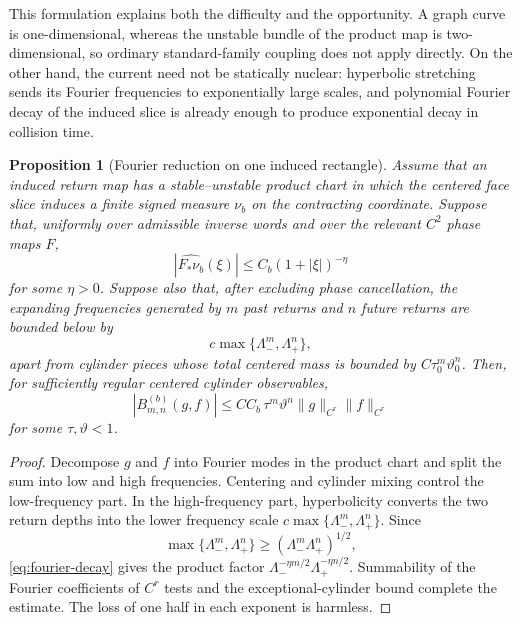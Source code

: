 \documentclass[11pt]{article}
\newtheorem{proposition}[theorem]{Proposition}
\begin{document}
This formulation explains both the difficulty and the opportunity.  A graph
curve is one-dimensional, whereas the unstable bundle of the product map is
two-dimensional, so ordinary standard-family coupling does not apply
directly.  On the other hand, the current need not be statically nuclear:
hyperbolic stretching sends its Fourier frequencies to exponentially large
scales, and polynomial Fourier decay of the induced slice is already enough
to produce exponential decay in collision time.

\begin{proposition}[Fourier reduction on one induced rectangle]
\label{prop:fourier-reduction}
Assume that an induced return map has a stable--unstable product chart in
which the centered face slice induces a finite signed measure $\nu_b$ on the
contracting coordinate.  Suppose that, uniformly over admissible inverse
words and over the relevant $C^2$ phase maps $F$,
\begin{equation}
\label{eq:fourier-decay}
 |\widehat{F_*\nu_b}(\xi)|\le C_b(1+|\xi|)^{-\eta}
\end{equation}
for some $\eta>0$.  Suppose also that, after excluding phase cancellation,
the expanding frequencies generated by $m$ past returns and $n$ future
returns are bounded below by
\[
 c\max\{\Lambda_-^m,\Lambda_+^n\},
\]
apart from cylinder pieces whose total centered mass is bounded by
$C\tau_0^m\vartheta_0^n$.  Then, for sufficiently regular
centered cylinder observables,
\begin{equation}
 |B_{m,n}^{(b)}(g,f)|
 \le C C_b\,\tau^m\vartheta^n\|g\|_{C^r}\|f\|_{C^r}
\end{equation}
for some $\tau,\vartheta<1$.
\end{proposition}

\begin{proof}
Decompose $g$ and $f$ into Fourier modes in the product chart and split the
sum into low and high frequencies.  Centering and cylinder mixing control the
low-frequency part.  In the high-frequency part, hyperbolicity converts the
two return depths into the lower frequency scale
$c\max\{\Lambda_-^m,\Lambda_+^n\}$.  Since
\[
 \max\{\Lambda_-^m,\Lambda_+^n\}
 \ge (\Lambda_-^m\Lambda_+^n)^{1/2},
\]
\eqref{eq:fourier-decay} gives the product factor
$\Lambda_-^{-\eta m/2}\Lambda_+^{-\eta n/2}$.  Summability of the Fourier
coefficients of $C^r$ tests and the exceptional-cylinder bound complete the
estimate.  The loss of one half in each exponent is harmless.
\end{proof}
\end{document}
